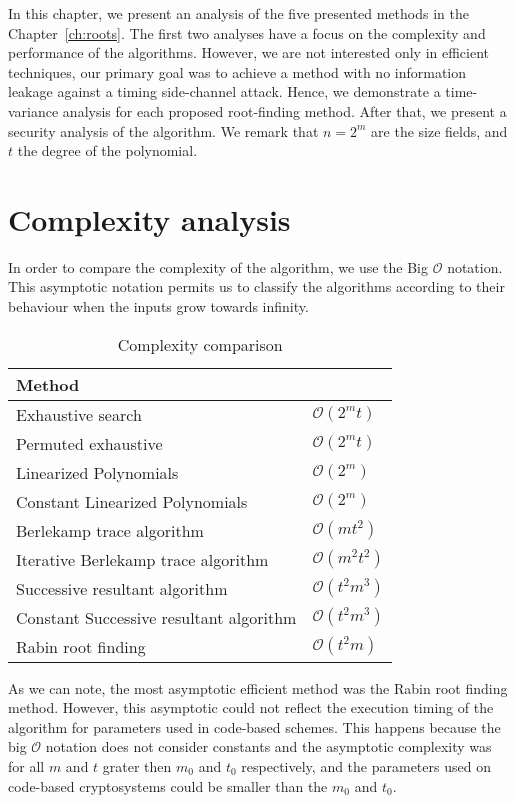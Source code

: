 In this chapter, we present an analysis of the five presented methods in the Chapter~\ref{ch:roots}. The first two analyses have a focus on the complexity and performance of the algorithms. However, we are not interested only in efficient techniques, our primary goal was to achieve a method with no information leakage against a timing side-channel attack. Hence, we demonstrate a time-variance analysis for each proposed root-finding method. After that, we present a security analysis of the algorithm. We remark that $n = 2^m$ are the size fields, and $t$ the degree of the polynomial.

\section{Complexity analysis}
In order to compare the complexity of the algorithm, we use the Big $\mathcal{O}$ notation. This asymptotic notation permits us to classify the algorithms according to their behaviour when the inputs grow towards infinity. 

\begin{table}[ht]
\centering
\label{tab:complexity}
\caption{Complexity comparison}
\begin{tabular}{ll}
Method                                  &                \\ \hline
Exhaustive search                       & $\mathcal{O}(2^mt)$ \\
Permuted exhaustive                     & $\mathcal{O}(2^mt)$ \\
Linearized Polynomials                  & $\mathcal{O}(2^m)$ \\
Constant Linearized Polynomials         & $\mathcal{O}(2^m)$ \\
Berlekamp trace algorithm               & $\mathcal{O}(mt^2)$ \\
Iterative Berlekamp trace algorithm     & $\mathcal{O}(m^2t^2)$ \\
Successive resultant algorithm          & $\mathcal{O}(t^2m^3)$ \\
Constant Successive resultant algorithm & $\mathcal{O}(t^2m^3)$ \\
Rabin root finding                      & $\mathcal{O}(t^2m)$
\end{tabular}
\end{table}

As we can note, the most asymptotic efficient method was the Rabin root finding method. However, this asymptotic could not reflect the execution timing of the algorithm for parameters used in code-based schemes. This happens because the big $\mathcal{O}$ notation does not consider constants and the asymptotic complexity was for all $m$ and $t$ grater then $m_0$ and $t_0$ respectively, and the parameters used on code-based cryptosystems could be smaller than the $m_0$ and $t_0$.

